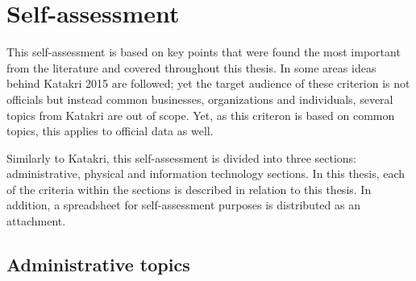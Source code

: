 \documentclass{article}
\begin{document}
\section{Self-assessment}
This self-assessment is based on key points that were found the most important from the literature and covered throughout this thesis. In some areas ideas behind Katakri 2015 are followed; yet the target audience of these criterion is not officials but instead common businesses, organizations and individuals, several topics from Katakri are out of scope. Yet, as this criteron is based on common topics, this applies to official data as well.
\par
Similarly to Katakri, this self-assessment is divided into three sections: administrative, physical and information technology sections. In this thesis, each of the criteria within the sections is described in relation to this thesis. In addition, a spreadsheet for self-assessment purposes is distributed as an attachment.
\subsection{Administrative topics}
\end{document}
